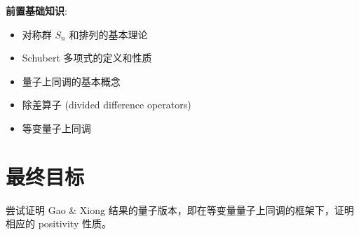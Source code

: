 \textbf{前置基础知识}:
\begin{itemize}
\item 对称群 $S_n$ 和排列的基本理论
\item Schubert 多项式的定义和性质
\item 量子上同调的基本概念
\item 除差算子 (divided difference operators)
\item 等变量子上同调
\end{itemize}

\section{最终目标}

尝试证明 Gao \& Xiong 结果的量子版本，即在等变量量子上同调的框架下，证明相应的 positivity 性质。

